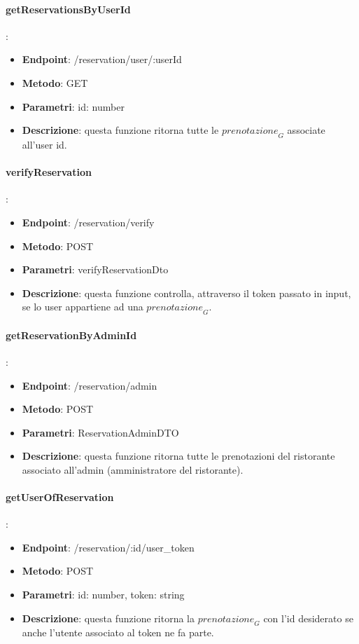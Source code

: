 \paragraph{getReservationsByUserId}:
\begin{itemize}
    \item \textbf{Endpoint}: /reservation/user/:userId
    \item \textbf{Metodo}: GET
    \item \textbf{Parametri}: id: number
    \item \textbf{Descrizione}: questa funzione ritorna tutte le $\textit{prenotazione}_G$ associate all'user id.
\end{itemize}
\paragraph{verifyReservation}:
\begin{itemize}
    \item \textbf{Endpoint}: /reservation/verify
    \item \textbf{Metodo}: POST
    \item \textbf{Parametri}: verifyReservationDto
    \item \textbf{Descrizione}: questa funzione controlla, attraverso il token passato in input, se lo user appartiene ad una $\textit{prenotazione}_G$.
\end{itemize}
\paragraph{getReservationByAdminId}:
\begin{itemize}
    \item \textbf{Endpoint}: /reservation/admin
    \item \textbf{Metodo}: POST
    \item \textbf{Parametri}: ReservationAdminDTO
    \item \textbf{Descrizione}: questa funzione ritorna tutte le prenotazioni del ristorante associato all'admin (amministratore del ristorante).
\end{itemize}
\paragraph{getUserOfReservation}:
\begin{itemize}
    \item \textbf{Endpoint}: /reservation/:id/user\_token
    \item \textbf{Metodo}: POST
    \item \textbf{Parametri}: id: number, token: string
    \item \textbf{Descrizione}: questa funzione ritorna la $\textit{prenotazione}_G$ con l'id desiderato se anche l'utente associato al token ne fa parte.
\end{itemize}
